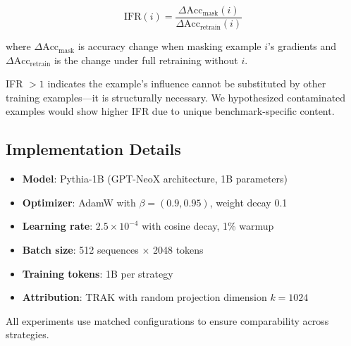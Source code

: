 \begin{equation}
\text{IFR}(i) = \frac{\Delta\text{Acc}_{\text{mask}}(i)}{\Delta\text{Acc}_{\text{retrain}}(i)}
\end{equation}

where $\Delta\text{Acc}_{\text{mask}}$ is accuracy change when masking example $i$'s gradients and $\Delta\text{Acc}_{\text{retrain}}$ is the change under full retraining without $i$.

IFR $> 1$ indicates the example's influence cannot be substituted by other training examples---it is structurally necessary. We hypothesized contaminated examples would show higher IFR due to unique benchmark-specific content.

\subsection{Implementation Details}

\begin{itemize}
    \item \textbf{Model}: Pythia-1B (GPT-NeoX architecture, 1B parameters)
    \item \textbf{Optimizer}: AdamW with $\beta = (0.9, 0.95)$, weight decay 0.1
    \item \textbf{Learning rate}: $2.5 \times 10^{-4}$ with cosine decay, 1\% warmup
    \item \textbf{Batch size}: 512 sequences $\times$ 2048 tokens
    \item \textbf{Training tokens}: 1B per strategy
    \item \textbf{Attribution}: TRAK with random projection dimension $k=1024$
\end{itemize}

All experiments use matched configurations to ensure comparability across strategies.
